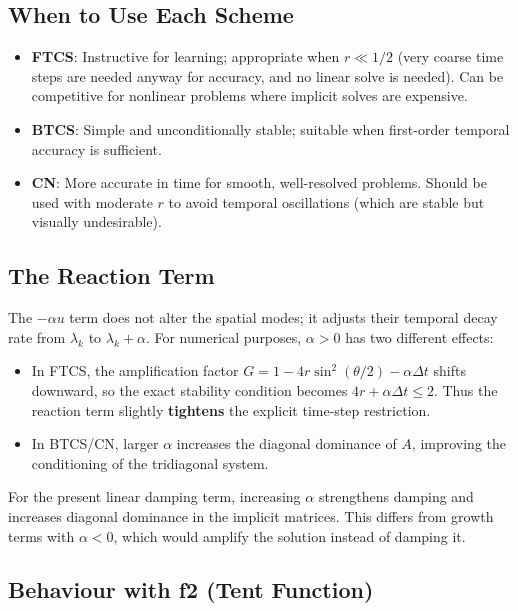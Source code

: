 \documentclass[11pt,a4paper]{article}
\begin{document}
\subsection{When to Use Each Scheme}

\begin{itemize}
\item \textbf{FTCS}: Instructive for learning; appropriate when $r \ll 1/2$ (very coarse time steps are needed anyway for accuracy, and no linear solve is needed). Can be competitive for nonlinear problems where implicit solves are expensive.
\item \textbf{BTCS}: Simple and unconditionally stable; suitable when first-order temporal accuracy is sufficient.
\item \textbf{CN}: More accurate in time for smooth, well-resolved problems. Should be used with moderate $r$ to avoid temporal oscillations (which are stable but visually undesirable).
\end{itemize}

\subsection{The Reaction Term}

The $-\alpha u$ term does not alter the spatial modes; it adjusts their temporal decay rate from $\lambda_k$ to $\lambda_k + \alpha$. For numerical purposes, $\alpha > 0$ has two different effects:

\begin{itemize}
\item In FTCS, the amplification factor $G = 1 - 4r\sin^2(\theta/2) - \alpha\Delta t$ shifts downward, so the exact stability condition becomes $4r+\alpha\Delta t\le 2$. Thus the reaction term slightly \textbf{tightens} the explicit time-step restriction.
\item In BTCS/CN, larger $\alpha$ increases the diagonal dominance of $A$, improving the conditioning of the tridiagonal system.
\end{itemize}

For the present linear damping term, increasing $\alpha$ strengthens damping and increases diagonal dominance in the implicit matrices. This differs from growth terms with $\alpha < 0$, which would amplify the solution instead of damping it.

\subsection{Behaviour with f2 (Tent Function)}
\end{document}
